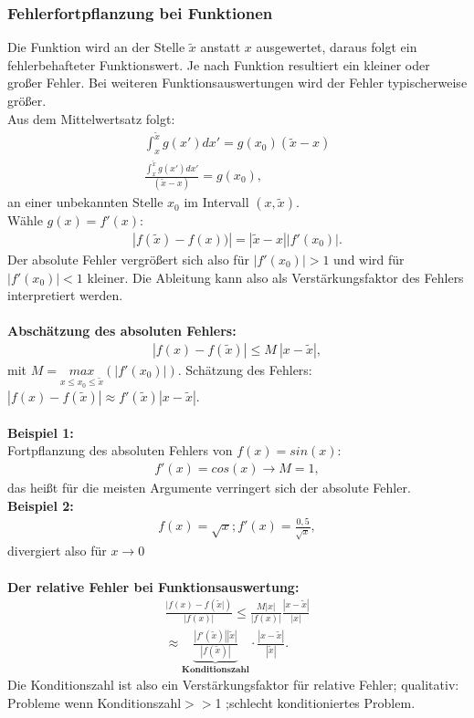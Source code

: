 \documentclass{scrartcl}
\begin{document}
\subsubsection{Fehlerfortpflanzung bei Funktionen}
Die Funktion wird an der Stelle $\tilde{x}$ anstatt $x$ ausgewertet, daraus folgt ein fehlerbehafteter Funktionswert.
Je nach Funktion resultiert ein kleiner oder großer Fehler.
Bei weiteren Funktionsauswertungen wird der Fehler typischerweise größer.\\
Aus dem Mittelwertsatz folgt:
\begin{align*}
\int_x^{\tilde{x}}g(x')dx'=g(x_0)(\tilde{x}-x)\\
\frac{\int_x^{\tilde{x}}g(x')dx'}{(\tilde{x}-x)}=g(x_0),
\end{align*}
an einer unbekannten Stelle $x_0$ im Intervall $(x,\tilde{x})$.\\
Wähle $g(x)=f'(x)$:
\begin{align*}
|f(\tilde{x})-f(x))|=|\tilde{x}-x||f'(x_0)|.
\end{align*}
Der absolute Fehler vergrößert sich also für $|f'(x_0)|>1$ und wird für $|f'(x_0)|<1$ kleiner.
Die Ableitung kann also als Verstärkungsfaktor des Fehlers interpretiert werden.\\
\\

\textbf{Abschätzung des absoluten Fehlers:}\\
\begin{align*}
|f(x)-f(\tilde{x})|\leq M \ |x-\tilde{x}|,
\end{align*}
mit $M=\underset{x\leq x_0 \leq \tilde{x}} {max} (|f'(x_0)|)$.
Schätzung des Fehlers: $|f(x)-f(\tilde{x})| \approx f'(\tilde{x})|x-\tilde{x}|$.\\
\\
\textbf{Beispiel 1:}\\
Fortpflanzung des absoluten Fehlers von $f(x)=sin(x)$:
\begin{align*}
f'(x)=cos(x) \rightarrow M=1,
\end{align*}
das heißt für die meisten Argumente verringert sich der absolute Fehler.\\
\textbf{Beispiel 2:}
\begin{align*}
f(x)=\sqrt{x};f'(x)=\frac{0,5}{\sqrt{x}},
\end{align*}
divergiert also für $x \rightarrow 0$\\
\\

\textbf{Der relative Fehler bei Funktionsauswertung:}
\begin{align*}
\frac{|f(x)-f(\tilde{x}|)}{|f(x)|}\leq \frac{M |x|}{|f(x)|} \frac{|x-\tilde{x}|}{|x|}\\
\approx \underbrace{\frac{|f'(\tilde{x})||\tilde{x}|}{|f(\tilde{x})|}}_{\textbf{Konditionszahl}} \cdot  \frac{|x-\tilde{x}|}{|\tilde{x}|}.
\end{align*}
Die Konditionszahl ist also ein Verstärkungsfaktor für relative Fehler;
qualitativ: Probleme wenn Konditionszahl$>>$1 ;schlecht konditioniertes Problem.
\end{document}

